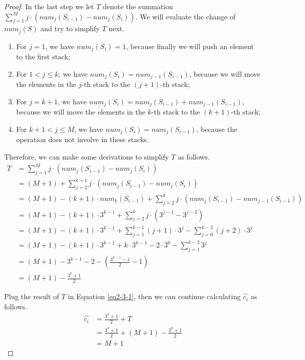 \documentclass[12pt,a4paper]{article}
\theoremstyle{definition}
\begin{document}
\begin{enumerate}
\begin{enumerate}
\begin{proof}
        In the last step we let $T$ denote the summation $\sum_{j=1}^M j \cdot (num_j(S_{i-1}) - num_j(S_i))$. We will evaluate the change of $num_j(S)$ and try to simplify $T$ next.
        \begin{enumerate}
        \item For $j = 1$, we have $num_j(S_i) = 1$, because finally we will push an element to the first stack;
        \item For $1 < j \leq k$, we have $num_j(S_i) = num_{j-1}(S_{i-1})$, because we will move the elements in the $j$-th stack to the $(j+1)$-th stack;
        \item For $j = k+1$, we have $num_j(S_i) = num_j(S_{i-1}) + num_{j-1}(S_{i-1})$, because we will move the elements in the $k$-th stack to the $(k+1)$-th stack;
        \item For $k + 1 < j \leq M$, we have $num_j(S_i) = num_j(S_{i-1})$, because the operation does not involve in these stacks.
        \end{enumerate}

        Therefore, we can make some derivations to simplify $T$ as follows.
        \begin{displaymath}
        \begin{aligned}
        T &=  \sum_{j=1}^M j \cdot (num_j(S_{i-1}) - num_j(S_i)) \\
          &=  (M + 1) + \sum_{j=2}^{k+1} j \cdot (num_j(S_{i-1}) - num_j(S_i)) \\
          &=  (M + 1) -(k+1)\cdot num_k(S_{i-1}) + \sum_{j=2}^{k} j \cdot (num_j(S_{i-1}) - num_{j-1}(S_{i-1})) \\
          &=  (M + 1) -(k+1)\cdot 3^{k-1} + \sum_{j=2}^k j \cdot(3^{j-1} - 3^{j-2}) \\
          &=  (M + 1) -(k+1)\cdot 3^{k-1} + \sum_{j=1}^{k-1} (j+1)\cdot 3^j - \sum_{j=0}^{k-2} (j+2)\cdot 3^j \\
          &=  (M + 1) -(k+1)\cdot 3^{k-1} + k \cdot 3^{k-1} - 2 \cdot 3^0 - \sum_{j=1}^{k-2} 3^j \\
          &=  (M + 1) -3^{k-1} - 2 - \left( \frac{3^{k-1} - 1}{2} - 1 \right) \\
          &=  (M + 1) - \frac{3^k + 1}{2}
        \end{aligned}
        \end{displaymath}

        Plug the result of $T$ in Equation \eqref{eq2-3-1}, then we can continue calculating $\hat{c_i}$ as follows.
        \begin{equation}
        \begin{aligned}
        \hat{c_i} &= \frac{3^k + 1}{2} + T \\
                  &= \frac{3^k + 1}{2} + (M + 1) - \frac{3^k + 1}{2} \\
                  &= M + 1
        \end{aligned}
        \label{eq2-3-2}
        \end{equation}


\end{proof}
\end{enumerate}
\end{enumerate}
\end{document}
